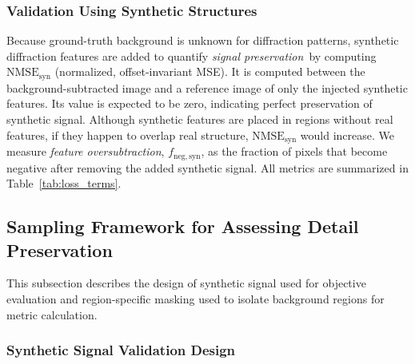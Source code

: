 \documentclass[journal,article,submit,moreauthors]{Definitions/mdpi}
\begin{document}
\subsubsection{Validation Using Synthetic Structures}

Because ground-truth background is unknown for diffraction patterns, synthetic diffraction features are added to quantify \textit{signal preservation}\ by computing $\mathrm{NMSE}_{\mathrm{syn}}$ (normalized, offset-invariant MSE). It is computed between the background-subtracted image and a reference image of only the injected synthetic features. Its value is expected to be zero, indicating perfect preservation of synthetic signal. Although synthetic features are placed in regions without real features, if they happen to overlap real structure, $\mathrm{NMSE}_{\mathrm{syn}}$ would increase. We measure \textit{feature oversubtraction}, $f_{\mathrm{neg,syn}}$, as the fraction of pixels that become negative after removing the added synthetic signal. All metrics are summarized in Table~\ref{tab:loss_terms}. 

\subsection{Sampling Framework for Assessing Detail Preservation}
\label{sec:sampling_framework}

This subsection describes the design of synthetic signal used for objective evaluation and region-specific masking used to isolate background regions for metric calculation.

\subsubsection{Synthetic Signal Validation Design}
\end{document}
